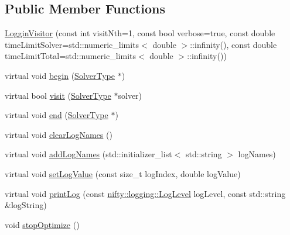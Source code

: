 \subsection*{Public Member Functions}
\begin{DoxyCompactItemize}
\item 
\hyperlink{classnifty_1_1graph_1_1optimization_1_1common_1_1LogginVisitor_a8c518aafb5e27de9d938a9ee2e8cfbbf}{Loggin\+Visitor} (const int visit\+Nth=1, const bool verbose=true, const double time\+Limit\+Solver=std\+::numeric\+\_\+limits$<$ double $>$\+::infinity(), const double time\+Limit\+Total=std\+::numeric\+\_\+limits$<$ double $>$\+::infinity())
\item 
virtual void \hyperlink{classnifty_1_1graph_1_1optimization_1_1common_1_1LogginVisitor_a5a9b2f1eee351ab61291772a3be97bc7}{begin} (\hyperlink{classnifty_1_1graph_1_1optimization_1_1common_1_1LogginVisitor_a1b8d6613cf8aeacf5fa4de64147a2ab2}{Solver\+Type} $\ast$)
\item 
virtual bool \hyperlink{classnifty_1_1graph_1_1optimization_1_1common_1_1LogginVisitor_ae2296d87949e1cdc28d93a0ce765e282}{visit} (\hyperlink{classnifty_1_1graph_1_1optimization_1_1common_1_1LogginVisitor_a1b8d6613cf8aeacf5fa4de64147a2ab2}{Solver\+Type} $\ast$solver)
\item 
virtual void \hyperlink{classnifty_1_1graph_1_1optimization_1_1common_1_1LogginVisitor_aab8d9fb15ab39584a1591641e1e0c47a}{end} (\hyperlink{classnifty_1_1graph_1_1optimization_1_1common_1_1LogginVisitor_a1b8d6613cf8aeacf5fa4de64147a2ab2}{Solver\+Type} $\ast$)
\item 
virtual void \hyperlink{classnifty_1_1graph_1_1optimization_1_1common_1_1LogginVisitor_a4c7b2ded33f697e8f9e049a4e0b1807b}{clear\+Log\+Names} ()
\item 
virtual void \hyperlink{classnifty_1_1graph_1_1optimization_1_1common_1_1LogginVisitor_a9cf671fac195e8432836be9aeabdee85}{add\+Log\+Names} (std\+::initializer\+\_\+list$<$ std\+::string $>$ log\+Names)
\item 
virtual void \hyperlink{classnifty_1_1graph_1_1optimization_1_1common_1_1LogginVisitor_aa11919ac7acff19c7e27b9256ced52a2}{set\+Log\+Value} (const size\+\_\+t log\+Index, double log\+Value)
\item 
virtual void \hyperlink{classnifty_1_1graph_1_1optimization_1_1common_1_1LogginVisitor_a4adcef93e0047ac765f59ef26fa45f1f}{print\+Log} (const \hyperlink{namespacenifty_1_1logging_a3385625f9a0dbb17f70c47d3fca2f64d}{nifty\+::logging\+::\+Log\+Level} log\+Level, const std\+::string \&log\+String)
\item 
void \hyperlink{classnifty_1_1graph_1_1optimization_1_1common_1_1LogginVisitor_a517cb60c08a1efa75c34682f60c5ad90}{stop\+Optimize} ()
\end{DoxyCompactItemize}


